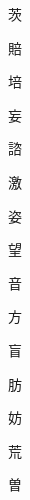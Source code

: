 {\Huge \begin{CJK}{UTF8}{min} 茨\end{CJK}}\hspace{0.1cm}
{\Huge \begin{CJK}{UTF8}{min} 賠\end{CJK}}\hspace{0.1cm}
{\Huge \begin{CJK}{UTF8}{min} 培\end{CJK}}\hspace{0.1cm}
{\Huge \begin{CJK}{UTF8}{min} 妄\end{CJK}}\hspace{0.1cm}
{\Huge \begin{CJK}{UTF8}{min} 諮\end{CJK}}\hspace{0.1cm}
{\Huge \begin{CJK}{UTF8}{min} 激\end{CJK}}\hspace{0.1cm}
{\Huge \begin{CJK}{UTF8}{min} 姿\end{CJK}}\hspace{0.1cm}
{\Huge \begin{CJK}{UTF8}{min} 望\end{CJK}}\hspace{0.1cm}
{\Huge \begin{CJK}{UTF8}{min} 音\end{CJK}}\hspace{0.1cm}
{\Huge \begin{CJK}{UTF8}{min} 方\end{CJK}}\hspace{0.1cm}
{\Huge \begin{CJK}{UTF8}{min} 盲\end{CJK}}\hspace{0.1cm}
{\Huge \begin{CJK}{UTF8}{min} 肪\end{CJK}}\hspace{0.1cm}
{\Huge \begin{CJK}{UTF8}{min} 妨\end{CJK}}\hspace{0.1cm}
{\Huge \begin{CJK}{UTF8}{min} 荒\end{CJK}}\hspace{0.1cm}
{\Huge \begin{CJK}{UTF8}{min} 曽\end{CJK}}\hspace{0.1cm}
